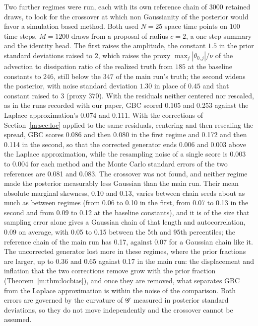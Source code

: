 Two further regimes were run, each with its own reference chain of $3000$ retained draws, to look for the crossover at which non Gaussianity of the posterior would favor a simulation based method. Both used $N=25$ space time points on $100$ time steps, $M=1200$ draws from a proposal of radius $c=2$, a one step summary and the identity head. The first raises the amplitude, the constant $1.5$ in the prior standard deviations raised to $2$, which raises the proxy $\max_j|\theta_{0,j}|/\nu$ of the advection to dissipation ratio of the realized truth from $185$ at the baseline constants to $246$, still below the $347$ of the main run's truth; the second widens the posterior, with noise standard deviation $1.30$ in place of $0.45$ and that constant raised to $3$ (proxy $370$). With the residuals neither centered nor rescaled, as in the runs recorded with our paper, GBC scored 0.105 and 0.253 against the Laplace approximation's 0.074 and 0.111. With the corrections of Section~\ref{m:sec:loc} applied to the same residuals, centering and then rescaling the spread, GBC scores 0.086 and then 0.080 in the first regime and 0.172 and then 0.114 in the second, so that the corrected generator ends 0.006 and 0.003 above the Laplace approximation, while the resampling noise of a single score is 0.003 to 0.004 for each method and the Monte Carlo standard errors of the two references are 0.081 and 0.083. The crossover was not found, and neither regime made the posterior measurably less Gaussian than the main run. Their mean absolute marginal skewness, 0.10 and 0.13, varies between chain seeds about as much as between regimes (from 0.06 to 0.10 in the first, from 0.07 to 0.13 in the second and from 0.09 to 0.12 at the baseline constants), and it is of the size that sampling error alone gives a Gaussian chain of that length and autocorrelation, 0.09 on average, with 0.05 to 0.15 between the 5th and 95th percentiles; the reference chain of the main run has 0.17, against 0.07 for a Gaussian chain like it. The uncorrected generator lost more in these regimes, where the prior fractions are larger, up to 0.36 and 0.65 against 0.17 in the main run: the displacement and inflation that the two corrections remove grow with the prior fraction (Theorem~\ref{m:thm:locbias}), and once they are removed, what separates GBC from the Laplace approximation is within the noise of the comparison. Both errors are governed by the curvature of $\mathscr{G}$ measured in posterior standard deviations, so they do not move independently and the crossover cannot be assumed.


